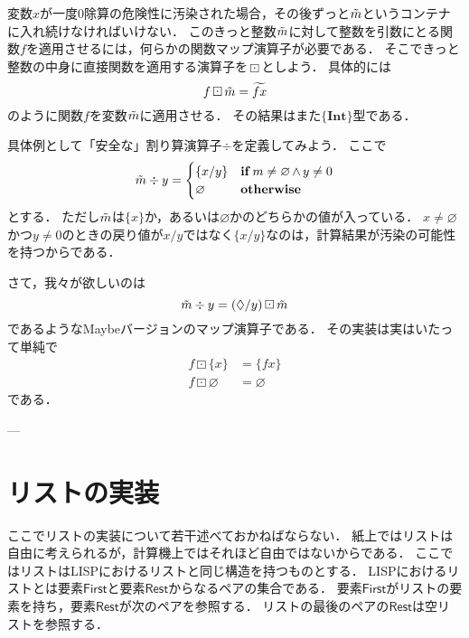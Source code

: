 \documentclass[twocolumn]{jsbook}
\newcommand{\hsklType}[1]{\textbf{#1}}
\DeclareMathOperator{\hsklMaybeMap}{\boxdot}
\newcommand{\hsklInt}{\hsklType{Int}}
\newcommand{\hsklNothing}{\varnothing}
\newcommand{\hsklJust}[1]{\{#1\}}
\newcommand{\hsklMaybe}[1]{\Tilde{#1}}
\newcommand{\hsklMaybeW}[1]{\widetilde{#1}}
\newcommand{\hsklMaybeType}[1]{\boldsymbol{\{}#1\boldsymbol{\}}}
\newcommand{\mathKeyword}[1]{\mathbf{#1}}
\newcommand{\mathVarKeyword}[1]{\mathsf{#1}}
\DeclareMathOperator{\mathAnd}{\wedge}
\DeclareMathOperator{\mathIf}{\mathKeyword{if}}
\newcommand{\mathFirst}{\mathVarKeyword{First}}
\newcommand{\mathLambdaAnonymousParameter}{\lozenge}
\newcommand{\mathOtherwise}{\mathKeyword{otherwise}}
\newcommand{\mathRest}{\mathVarKeyword{Rest}}
\newcommand{\typename}[1]{\mathbf{#1}}
\newcommand{\typeconstructor}[2]{\mathop{#1}\,#2}
\newcommand{\typeint}{\typename{Int}}
\newcommand{\typemaybe}{\typename{Maybe}}
\newcommand{\constantnothing}{\varnothing}
\newcommand{\binarymaybefunctormap}{\boxdot}
\newcommand{\binarymaybeappend}{\boxplus}
\newcommand{\maybetype}[1]{\left\{#1\right\}}
\begin{document}
変数$x$が一度$0$除算の危険性に汚染された場合，その後ずっと$\hsklMaybe{m}$というコンテナに入れ続けなければいけない．
このきっと整数$\hsklMaybe{m}$に対して整数を引数にとる関数$f$を適用させるには，何らかの関数マップ演算子が必要である．
そこできっと整数の中身に直接関数を適用する演算子を$\hsklMaybeMap$としよう．
具体的には$$f\hsklMaybeMap\hsklMaybe{m}=\hsklMaybeW{fx}$$のように関数$f$を変数$\hsklMaybe{m}$に適用させる．
その結果はまた$\hsklMaybeType{\hsklInt}$型である．

具体例として「安全な」割り算演算子$\div$を定義してみよう．
ここで
\begin{equation*}
\hsklMaybe{m}\div y=\begin{cases}\hsklJust{x/y}&\mathIf m\neq\hsklNothing\mathAnd y\neq0\\
\hsklNothing&\mathOtherwise\end{cases}
\end{equation*}
とする．
ただし$\hsklMaybe{m}$は$\hsklJust{x}$か，あるいは$\hsklNothing$かのどちらかの値が入っている．
$x\neq\hsklNothing$かつ$y\neq0$のときの戻り値が$x/y$ではなく$\hsklJust{x/y}$なのは，計算結果が汚染の可能性を持つからである．

さて，我々が欲しいのは$$\hsklMaybe{m}\div y=(\mathLambdaAnonymousParameter/y)\hsklMaybeMap\hsklMaybe{m}$$であるようなMaybeバージョンのマップ演算子である．
その実装は実はいたって単純で
\begin{align*}
f\hsklMaybeMap\hsklJust{x}&=\hsklJust{fx}\\
f\hsklMaybeMap\hsklNothing&=\hsklNothing
\end{align*}
である．



---

\section{リストの実装}

ここでリストの実装について若干述べておかねばならない．
紙上ではリストは自由に考えられるが，計算機上ではそれほど自由ではないからである．
ここではリストはLISPにおけるリストと同じ構造を持つものとする．
LISPにおけるリストとは要素$\mathFirst$と要素$\mathRest$からなるペアの集合である．
要素$\mathFirst$がリストの要素を持ち，要素$\mathRest$が次のペアを参照する．
リストの最後のペアの$\mathRest$は空リストを参照する．
\end{document}
